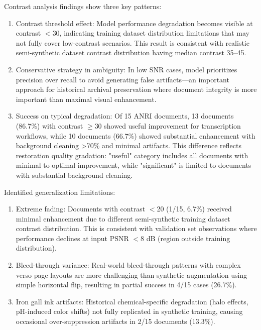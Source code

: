 \documentclass[journal]{IEEEtran}
\begin{document}
Contrast analysis findings show three key patterns:
\begin{enumerate}
    \item Contrast threshold effect: Model performance degradation becomes visible at contrast $<$30, indicating training dataset distribution limitations that may not fully cover low-contrast scenarios. This result is consistent with realistic semi-synthetic dataset contrast distribution having median contrast 35--45.
    
    \item Conservative strategy in ambiguity: In low SNR cases, model prioritizes precision over recall to avoid generating false artifacts---an important approach for historical archival preservation where document integrity is more important than maximal visual enhancement.
    
    \item Success on typical degradation: Of 15 ANRI documents, 13 documents (86.7\%) with contrast $\geq$30 showed useful improvement for transcription workflows, while 10 documents (66.7\%) showed substantial enhancement with background cleaning >70\% and minimal artifacts. This difference reflects restoration quality gradation: "useful" category includes all documents with minimal to optimal improvement, while "significant" is limited to documents with substantial background cleaning.
\end{enumerate}

Identified generalization limitations:
\begin{enumerate}
    \item Extreme fading: Documents with contrast $<$20 (1/15, 6.7\%) received minimal enhancement due to different semi-synthetic training dataset contrast distribution. This is consistent with validation set observations where performance declines at input PSNR $<$8 dB (region outside training distribution).
    
    \item Bleed-through variance: Real-world bleed-through patterns with complex verso page layouts are more challenging than synthetic augmentation using simple horizontal flip, resulting in partial success in 4/15 cases (26.7\%).
    
    \item Iron gall ink artifacts: Historical chemical-specific degradation (halo effects, pH-induced color shifts) not fully replicated in synthetic training, causing occasional over-suppression artifacts in 2/15 documents (13.3\%).
\end{enumerate}
\end{document}

